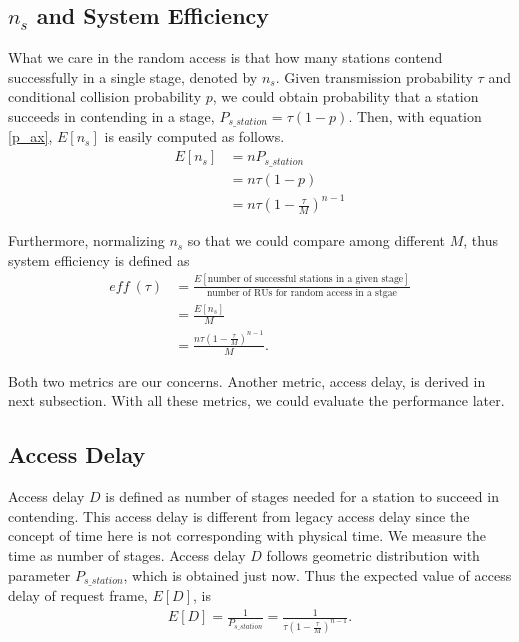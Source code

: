 \subsection{$n_s$ and System Efficiency}
What we care in the random access is that how many stations contend successfully in a single stage, denoted by $n_s$.
Given transmission probability $\tau$ and conditional collision probability $p$, we could obtain probability that a station succeeds in contending in a stage, $P_{s\_station} = \tau (1-p)$.
Then, with equation \ref{p_ax}, $E[n_s]$ is easily computed as follows. 
\begin{align}
\label{equ_ns}
E[n_s] &= n P_{s\_station} \nonumber \\
		&= n\tau (1-p) \nonumber \\
		&= n\tau (1-\frac{\tau}{M})^{n-1}
\end{align}

Furthermore, normalizing $n_s$ so that we could compare among different $M$, thus system efficiency is defined as 
\begin{align}
\label{eff_def}
\textit{eff}\ (\tau) &= \frac{E[\text{number of successful stations in a given stage}]}{\text{number of RUs for random access in a stgae}} \nonumber\\
					 &=\frac{E[n_s]}{M} \nonumber \\
					 &= \frac{n\tau(1-\frac{\tau}{M})^{n-1}}{M}.
\end{align}

Both two metrics are our concerns. Another metric, access delay, is derived in next subsection.
With all these metrics, we could evaluate the performance later.

	
\subsection{Access Delay}
Access delay $D$ is defined as number of stages needed for a station to succeed in contending.  
This access delay is different from legacy access delay since the concept of time here is not corresponding with physical time.
We measure the time as number of stages.
Access delay $D$ follows geometric distribution with parameter $P_{s\_station}$, which is obtained just now.
Thus the expected value of access delay of request frame, $E[D]$, is 
\begin{align}
\label{equ_delay}
E[D] = \frac{1}{P_{s\_{station}}} = \frac{1}{\tau (1-\frac{\tau}{M})^{n-1}}.
\end{align}

